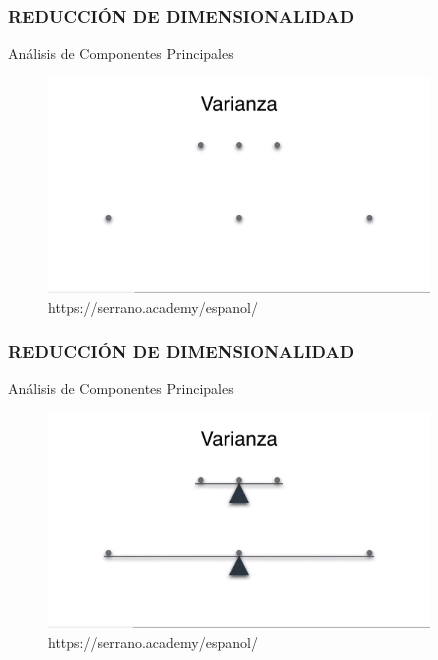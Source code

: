 \documentclass{beamer}
\begin{document}
\begin{frame}
	\frametitle{REDUCCIÓN DE DIMENSIONALIDAD}
	\begin{block}{Análisis de Componentes Principales}	
		\begin{figure}
			\includegraphics[width=0.9\textwidth]{PCA/IMG_3545.jpg}
			\caption{https://serrano.academy/espanol/}
		\end{figure}
	\end{block}
\end{frame}

\begin{frame}
	\frametitle{REDUCCIÓN DE DIMENSIONALIDAD}
	\begin{block}{Análisis de Componentes Principales}	
		\begin{figure}
			\includegraphics[width=0.9\textwidth]{PCA/IMG_3546.jpg}
			\caption{https://serrano.academy/espanol/}
		\end{figure}
	\end{block}
\end{frame}
\end{document}
